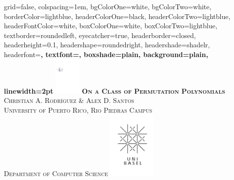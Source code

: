 \documentclass[landscape,final,fontscale=0.225,paperwidth=67.5in,paperheight=45in]{baposter}
\begin{document}
\begin{poster}%
  {
  grid=false,
  colspacing=1em,
  bgColorOne=white,
  bgColorTwo=white,
  borderColor=lightblue,
  headerColorOne=black,
  headerColorTwo=lightblue,
  headerFontColor=white,
  boxColorOne=white,
  boxColorTwo=lightblue,
  textborder=roundedleft,
  eyecatcher=true,
  headerborder=closed,
  headerheight=0.1\textheight,
  headershape=roundedright,
  headershade=shadelr,
  headerfont=\Large\bf\textsc, %
  textfont={\setlength{\parindent}{1.5em}},
  boxshade=plain,
  background=plain,
  linewidth=2pt
  }
  {\includegraphics[height=5em]{images/graph_occluded.pdf}} 
  {\bf\textsc{On a Class of Permutation Polynomials}\vspace{0.1em}}
  {\textsc{Christian A. Rodr\'{\i}guez \& Alex D. Santos \\ University of Puerto Rico, Rio Piedras Campus \\ Department of Computer Science}}
  {%
    \includegraphics[height=9.0em]{images/logo}
  }

    \newcommand{\colouredcircle}{%
      \tikz{\useasboundingbox (-0.2em,-0.32em) rectangle(0.2em,0.32em); \draw[draw=black,fill=lightblue,line width=0.03em] (0,0) circle(0.18em);}}


\end{poster}
\end{document}
